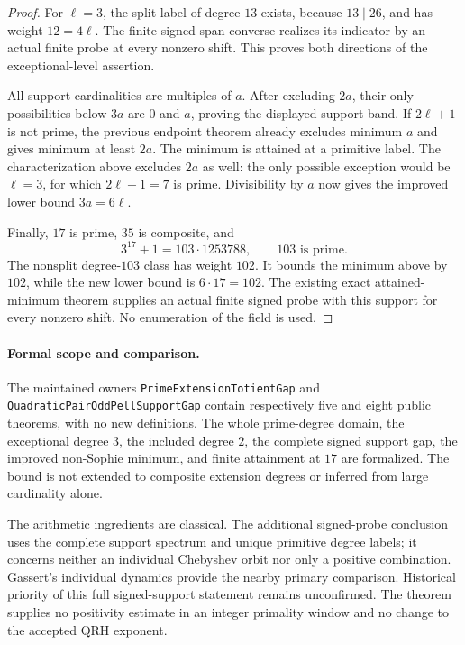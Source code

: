 \documentclass[11pt]{article}
\begin{document}
\begin{proof}
For \(\ell=3\), the split label of degree \(13\) exists,
because \(13\mid26\), and has weight \(12=4\ell\).
The finite signed-span converse realizes its indicator
by an actual finite probe at every nonzero shift.
This proves both directions of the exceptional-level assertion.

All support cardinalities are multiples of \(a\).
After excluding \(2a\), their only possibilities below \(3a\)
are \(0\) and \(a\), proving the displayed support band.
If \(2\ell+1\) is not prime, the previous endpoint theorem
already excludes minimum \(a\) and gives minimum at least
\(2a\). The minimum is attained at a primitive label.
The characterization above excludes \(2a\) as well:
the only possible exception would be \(\ell=3\), for which
\(2\ell+1=7\) is prime. Divisibility by \(a\) now gives
the improved lower bound \(3a=6\ell\).

Finally, \(17\) is prime, \(35\) is composite, and
\[
                      3^{17}+1=103\cdot1253788,
              \qquad 103\text{ is prime}.
\]
The nonsplit degree-\(103\) class has weight \(102\).
It bounds the minimum above by \(102\), while the new lower
bound is \(6\cdot17=102\). The existing exact attained-minimum
theorem supplies an actual finite signed probe with this support
for every nonzero shift. No enumeration of the field is used.
\end{proof}

\paragraph{Formal scope and comparison.}
The maintained owners \texttt{PrimeExtensionTotientGap} and
\texttt{QuadraticPairOddPellSupportGap} contain respectively
five and eight public theorems, with no new definitions.
The whole prime-degree domain, the exceptional degree \(3\),
the included degree \(2\), the complete signed support gap,
the improved non-Sophie minimum, and finite attainment at \(17\)
are formalized. The bound is not extended to composite
extension degrees or inferred from large cardinality alone.

The arithmetic ingredients are classical. The additional
signed-probe conclusion uses the complete support spectrum
and unique primitive degree labels; it concerns neither
an individual Chebyshev orbit nor only a positive combination.
Gassert's individual dynamics \cite{GassertChebyshevGraphs}
provide the nearby primary comparison. Historical priority
of this full signed-support statement remains unconfirmed.
The theorem supplies no positivity estimate in an integer
primality window and no change to the accepted QRH exponent.
\end{document}
